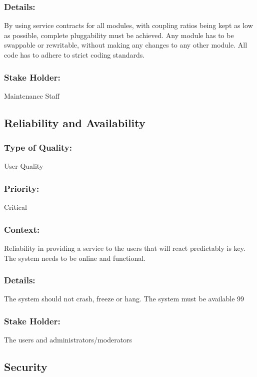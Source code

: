 \documentclass[11pt]{article}
\begin{document}
		\subsubsection{Details:}
			\textbf{}By using service contracts for all modules, with coupling ratios being kept as low as possible, complete pluggability must be achieved. Any module has to be swappable or rewritable, without making any changes to any other module. All code has to adhere to strict coding standards.
		
		\subsubsection{Stake Holder:}
			\textbf{}Maintenance Staff

	\subsection{Reliability and Availability}
		\subsubsection{Type of Quality:}
			\textbf{}User Quality
		
		\subsubsection{Priority:}
			\textbf{} Critical

		\subsubsection{Context:}
			\textbf{}Reliability in providing a service to the users that will react predictably is key. The system needs to be online and functional.
		
		\subsubsection{Details:}
			\textbf{}The system should not crash, freeze or hang. The system must be available 99%
		
		\subsubsection{Stake Holder:}
			\textbf{}The users and administrators/moderators

	\subsection{Security}
\end{document}
